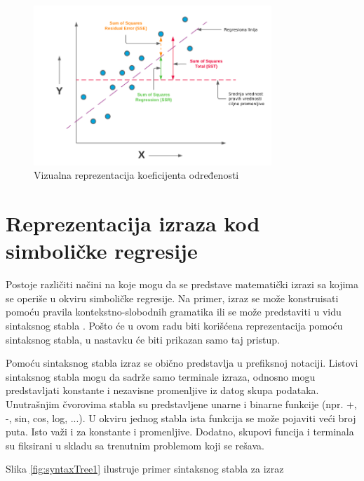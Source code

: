\documentclass[main.tex]{subfiles}
\begin{document}
\begin{figure}[!ht]
\begin{center}
\includegraphics[width=0.8\textwidth]{../images/rSquared.jpg}
\end{center}
\caption{Vizualna reprezentacija koeficijenta određenosti}
\label{fig:R2}
\end{figure}


\section{Reprezentacija izraza kod simboličke regresije}
\label{sec:expressionRepr}

Postoje različiti načini na koje mogu da se predstave matematički izrazi sa kojima se operiše u okviru simboličke regresije. Na primer, izraz se može konstruisati pomoću pravila kontekstno-slobodnih gramatika \cite{grammarForEquationDiscovery, abstractExprGrammar, automaticGrammaticalEvolution} ili se može predstaviti u vidu sintaksnog stabla \cite{koza, semanticCrossover, beeColony, vnp}. Pošto će u ovom radu biti korišćena reprezentacija pomoću sintaksnog stabla, u nastavku će biti prikazan samo taj pristup.

Pomoću sintaksnog stabla izraz se obično predstavlja u prefiksnoj notaciji. Listovi sintaksnog stabla mogu da sadrže samo terminale izraza, odnosno mogu predstavljati konstante i nezavisne promenljive iz datog skupa podataka. Unutrašnjim čvorovima stabla su predstavljene unarne i binarne funkcije (npr. +, -, sin, cos, log, ...).
U okviru jednog stabla ista funkcija se može pojaviti veći broj puta. Isto važi i za konstante i promenljive.
Dodatno, skupovi funcija i terminala su fiksirani u skladu sa trenutnim problemom koji se rešava.

Slika \ref{fig:syntaxTree1} ilustruje primer sintaksnog stabla za izraz
\end{document}
